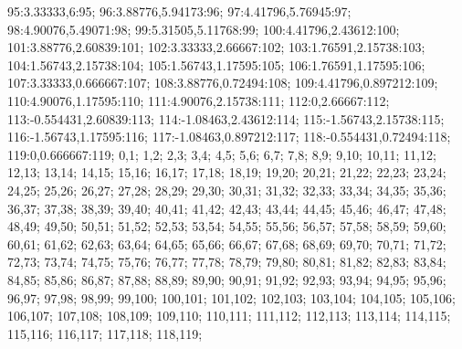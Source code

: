\documentclass[a4paper,10pt,ngerman]{scrartcl}
\begin{document}
{    95:3.33333,6:95;
    96:3.88776,5.94173:96;
    97:4.41796,5.76945:97;
    98:4.90076,5.49071:98;
    99:5.31505,5.11768:99;
    100:4.41796,2.43612:100;
    101:3.88776,2.60839:101;
    102:3.33333,2.66667:102;
    103:1.76591,2.15738:103;
    104:1.56743,2.15738:104;
    105:1.56743,1.17595:105;
    106:1.76591,1.17595:106;
    107:3.33333,0.666667:107;
    108:3.88776,0.72494:108;
    109:4.41796,0.897212:109;
    110:4.90076,1.17595:110;
    111:4.90076,2.15738:111;
    112:0,2.66667:112;
    113:-0.554431,2.60839:113;
    114:-1.08463,2.43612:114;
    115:-1.56743,2.15738:115;
    116:-1.56743,1.17595:116;
    117:-1.08463,0.897212:117;
    118:-0.554431,0.72494:118;
    119:0,0.666667:119;
}{
0,1;
1,2;
2,3;
3,4;
4,5;
5,6;
6,7;
7,8;
8,9;
9,10;
10,11;
11,12;
12,13;
13,14;
14,15;
15,16;
16,17;
17,18;
18,19;
19,20;
20,21;
21,22;
22,23;
23,24;
24,25;
25,26;
26,27;
27,28;
28,29;
29,30;
30,31;
31,32;
32,33;
33,34;
34,35;
35,36;
36,37;
37,38;
38,39;
39,40;
40,41;
41,42;
42,43;
43,44;
44,45;
45,46;
46,47;
47,48;
48,49;
49,50;
50,51;
51,52;
52,53;
53,54;
54,55;
55,56;
56,57;
57,58;
58,59;
59,60;
60,61;
61,62;
62,63;
63,64;
64,65;
65,66;
66,67;
67,68;
68,69;
69,70;
70,71;
71,72;
72,73;
73,74;
74,75;
75,76;
76,77;
77,78;
78,79;
79,80;
80,81;
81,82;
82,83;
83,84;
84,85;
85,86;
86,87;
87,88;
88,89;
89,90;
90,91;
91,92;
92,93;
93,94;
94,95;
95,96;
96,97;
97,98;
98,99;
99,100;
100,101;
101,102;
102,103;
103,104;
104,105;
105,106;
106,107;
107,108;
108,109;
109,110;
110,111;
111,112;
112,113;
113,114;
114,115;
115,116;
116,117;
117,118;
118,119;
}
    \newpage

    \newpage
\end{document}
